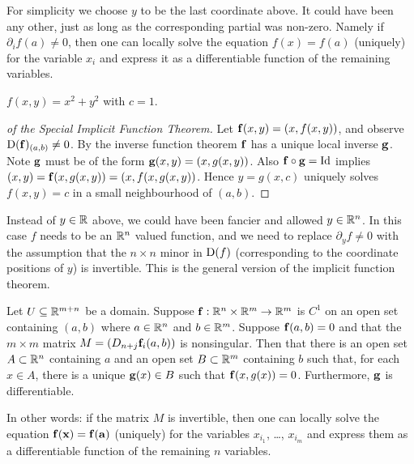   \begin{remark}
    For simplicity we choose $y$ to be the last coordinate above.
    It could have been any other, just as long as the corresponding partial was non-zero.
    Namely if $\partial_i f(a) \neq 0$, then one can locally solve the equation $f(x) = f(a)$ (uniquely) for the variable $x_i$ and express it as a differentiable function of the remaining variables.
  \end{remark}

  \begin{exa}
    $f(x, y) = x^2 + y^2$ with $c = 1$.
  \end{exa}

  \begin{proof} [of the Special  Implicit Function Theorem]  
    Let $\mathbf{ f}(x, y) = (x, f(x, y))$, and observe ${\mathrm{D}}(\mathbf{ f})_{(a, b)} \neq 0$. By the inverse function theorem $\mathbf{ f}$ has a unique local inverse $\mathbf{ g}$.
    Note $\mathbf{ g}$ must be of the form $\mathbf{ g}(x, y) = (x, g(x, y))$.
    Also $\mathbf{ f}\circ \mathbf{ g} = \text{Id}$ implies $(x, y) = \mathbf{ f}( x, g(x, y) ) = (x, f(x, g(x,y))$.
    Hence $y = g(x, c)$ uniquely solves $f(x, y) = c$ in a small neighbourhood of $(a, b)$.
  \end{proof}

  Instead of $y \in \mathbb{R} $ above, we could have been fancier and allowed $y \in \mathbb{R} ^n$.
  In this case $f$ needs to be an $\mathbb{R} ^n$ valued function, and we need to replace $\partial_y f \neq 0$ with the assumption that the $n \times n$ minor in ${\mathrm{D}}(f)$ (corresponding to the coordinate positions of $y$) is invertible.
  This is the general version of the implicit function theorem.
  

  \begin{theorem}
    Let $U \subseteq \mathbb{R} ^{m + n}$ be a domain. Suppose $\mathbf{ f}: \mathbb{R}^n\times\mathbb{R}^m \to \mathbb{R}^m$ is $C^1$ on an open set containing $(a,b)$ where
  $a\in\mathbb{R}^n$ and $b\in\mathbb{R}^m$.  Suppose $\mathbf{ f}(a,b)=0$ and that the $m\times m$
  matrix $M=(D_{n+j}\mathbf{ f}_i(a,b))$ is nonsingular.
  Then that there is an open set $A\subset \mathbb{R}^n$ containing $a$ and an open set $B\subset \mathbb{R}^m$ 
  containing $b$ such that, for each $x\in A$, there is a unique $\mathbf{ g}(x)\in B$ such that
  $\mathbf{ f}(x, g(x))=0$.  Furthermore, $\mathbf{ g}$ is differentiable.
  \end{theorem}
  
  In other words: if the matrix $M$ is invertible, then one can locally solve the equation $\mathbf{ f}(\mathbf{ x}) =  \mathbf{ f}(\mathbf{ a}) $ (uniquely) for the variables $x_{i_1}$, \dots, $x_{i_m}$ and express them as a differentiable function of the remaining $n$ variables.
  
